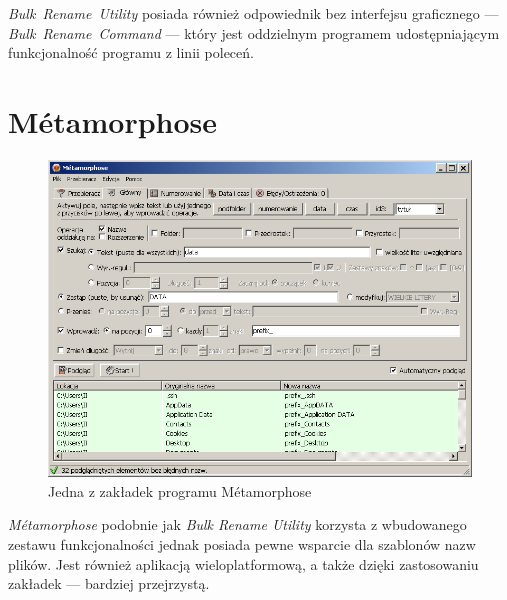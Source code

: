\textit{Bulk~Rename~Utility} posiada również odpowiednik bez interfejsu graficznego --- \textit{Bulk~Rename~Command} --- który jest oddzielnym programem udostępniającym funkcjonalność programu z linii poleceń.

\section{Métamorphose}
\begin{figure}[h]
\begin{center}
\includegraphics[scale=0.75]{img/metamorphose_window.png}
\end{center}
\caption{Jedna z zakładek programu Métamorphose}
\end{figure}

\par
\textit{Métamorphose} podobnie jak \textit{Bulk Rename Utility} korzysta z wbudowanego zestawu funkcjonalności jednak posiada pewne wsparcie dla szablonów nazw plików. Jest również aplikacją wieloplatformową, a także dzięki zastosowaniu zakładek --- bardziej przejrzystą.

